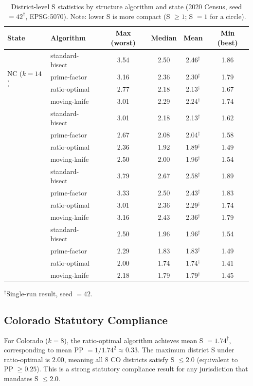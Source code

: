 \begin{table}[ht]
\centering
\caption{District-level S statistics by structure algorithm and state
(2020 Census, seed $= 42^\dagger$, EPSG:5070).
Note: lower S is more compact (S $\geq 1$; S $= 1$ for a circle).}
\label{tab:s_main}
\begin{tabular}{llcccc}
\toprule
State & Algorithm & Max (worst) & Median & Mean & Min (best) \\
\midrule
\multirow{4}{*}{NC ($k=14$)}
  & standard-bisect & 3.54 & 2.50 & 2.46$^\dagger$ & 1.86 \\
  & prime-factor    & 3.16 & 2.36 & 2.30$^\dagger$ & 1.79 \\
  & ratio-optimal   & 2.77 & 2.18 & 2.13$^\dagger$ & 1.67 \\
  & moving-knife    & 3.01 & 2.29 & 2.24$^\dagger$ & 1.74 \\
\addlinespace
\multirow{4}{*}{WI ($k=8$)}
  & standard-bisect & 3.01 & 2.18 & 2.13$^\dagger$ & 1.62 \\
  & prime-factor    & 2.67 & 2.08 & 2.04$^\dagger$ & 1.58 \\
  & ratio-optimal   & 2.36 & 1.92 & 1.89$^\dagger$ & 1.49 \\
  & moving-knife    & 2.50 & 2.00 & 1.96$^\dagger$ & 1.54 \\
\addlinespace
\multirow{4}{*}{TX ($k=38$)}
  & standard-bisect & 3.79 & 2.67 & 2.58$^\dagger$ & 1.89 \\
  & prime-factor    & 3.33 & 2.50 & 2.43$^\dagger$ & 1.83 \\
  & ratio-optimal   & 3.01 & 2.36 & 2.29$^\dagger$ & 1.74 \\
  & moving-knife    & 3.16 & 2.43 & 2.36$^\dagger$ & 1.79 \\
\addlinespace
\multirow{4}{*}{CO ($k=8$)}
  & standard-bisect & 2.50 & 1.96 & 1.96$^\dagger$ & 1.54 \\
  & prime-factor    & 2.29 & 1.83 & 1.83$^\dagger$ & 1.49 \\
  & ratio-optimal   & 2.00 & 1.74 & 1.74$^\dagger$ & 1.41 \\
  & moving-knife    & 2.18 & 1.79 & 1.79$^\dagger$ & 1.45 \\
\bottomrule
\end{tabular}
\begin{tablenotes}
\footnotesize
\item $^\dagger$Single-run result, seed $= 42$.
\end{tablenotes}
\end{table}

\subsection{Colorado Statutory Compliance}

For Colorado ($k=8$), the ratio-optimal algorithm achieves mean S $= 1.74^\dagger$,
corresponding to mean PP $= 1/1.74^2 \approx 0.33$.
The maximum district S under ratio-optimal is $2.00$, meaning all 8 CO districts
satisfy S $\leq 2.0$ (equivalent to PP $\geq 0.25$).
This is a strong statutory compliance result for any jurisdiction that mandates
S $\leq 2.0$.
